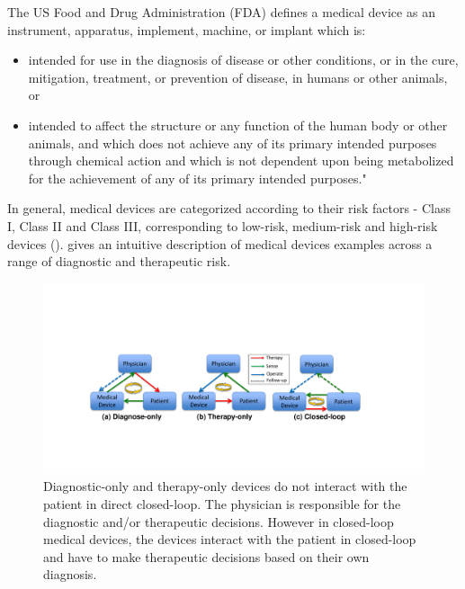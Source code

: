 The US Food and Drug Administration (FDA) defines a medical device as an instrument, apparatus, implement, machine, or implant which is:
\begin{itemize}
	\item intended for use in the diagnosis of disease or other conditions, or in the cure, mitigation, treatment, or prevention of disease, in humans or other animals, or
	\item intended to affect the structure or any function of the human body or other animals, and which does not achieve any of its primary intended purposes through chemical action and which is not dependent upon being metabolized for the achievement of any of its primary intended purposes."
\end{itemize}

In general, medical devices are categorized according to their risk factors - Class I, Class II and Class III, corresponding to low-risk, medium-risk and high-risk devices (\cite{class}).  
 gives an intuitive description of medical devices examples across a range of diagnostic and therapeutic risk.

\begin{figure}[t]
		\centering
		\includegraphics[width=\textwidth]{figs/closed-loop.pdf}
		\caption{\small Diagnostic-only and therapy-only devices do not interact with the patient in direct closed-loop. The physician is responsible for the diagnostic and/or therapeutic decisions. However in closed-loop medical devices, the devices interact with the patient in closed-loop and have to make therapeutic decisions based on their own diagnosis.}
		\label{fig:closed-loop}
\end{figure}

